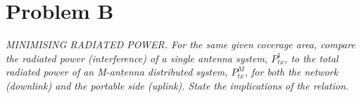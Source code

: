 \section{Problem B}

\textit{MINIMISING RADIATED POWER. For the same given coverage area, compare the radiated power (interference) of a single antenna system, $P_{tx}^1$, to the total radiated power of an M-antenna distributed system, $P_{tx}^M$, for both the network (downlink) and the portable side (uplink). State the implications of the relation.}